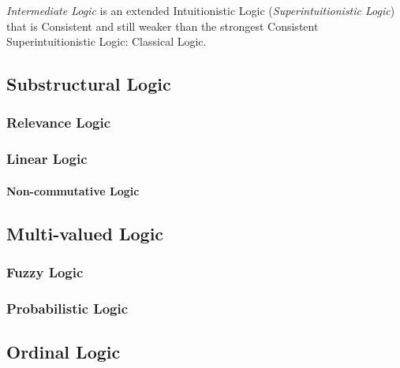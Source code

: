 \documentclass{article}
\begin{document}
\emph{Intermediate Logic} is an extended Intuitionistic Logic
(\emph{Superintuitionistic Logic}) that is Consistent and still weaker
than the strongest Consistent Superintuitionistic Logic: Classical
Logic.

\subsection{Substructural Logic}\label{subsec:substructural_logic}

\subsubsection{Relevance Logic}\label{subsec:relevance_logic}

\subsubsection{Linear Logic}\label{subsec:linear_logic}

\paragraph{Non-commutative Logic}\label{subsec:noncommutative_logic}



\subsection{Multi-valued Logic} \label{subsec:multi_valued_logic}

\subsubsection{Fuzzy Logic}

\subsubsection{Probabilistic Logic}



\subsection{Ordinal Logic}
\end{document}

